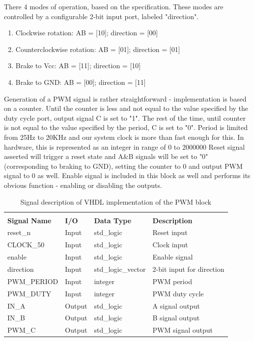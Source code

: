 There 4 modes of operation, based on the specification. These modes are controlled by a configurable 2-bit input port, labeled "direction".
\begin{enumerate}
 \item Clockwise rotation: AB = [10]; direction = [00]
 \item Counterclockwise rotation: AB = [01]; direction = [01]
 \item Brake to Vcc: AB = [11]; direction = [10]
 \item Brake to GND: AB = [00]; direction = [11]
\end{enumerate}

Generation of a PWM signal is rather straightforward - implementation is based on a counter. Until the counter is less and not equal to the value specified by the duty cycle port, output signal C is set to "1". The rest of the time, until counter is not equal to the value specified by the period, C is set to "0". Period is limited from 25Hz to 20KHz and our system clock is more than fast enough for this. In hardware, this is represented as an integer in range of 0 to 2000000 Reset signal asserted will trigger a reset state and A&B signals will be set to "0" (corresponding to braking to GND), setting the counter to 0 and output PWM signal to 0 as well. Enable signal is included in this block as well and performs its obvious function - enabling or disabling the outputs.

\begin{table}[!htbp]
\small
   \caption{Signal description of VHDL implementation of the PWM block}
   \centering
\begin{tabular}{l l l l} \hline\\ 
\textbf{Signal Name} & \textbf{I/O} & \textbf{Data Type} & \textbf{Description}  \\ \hline
reset\_n & Input  & std\_logic & Reset input \\ \hline
CLOCK\_50 & Input  & std\_logic & Clock input \\ \hline
enable & Input & std\_logic & Enable signal \\ \hline
direction & Input & std\_logic\_vector & 2-bit input for direction \\ \hline
PWM\_PERIOD & Input & integer & PWM period \\ \hline
PWM\_DUTY & Input & integer & PWM duty cycle \\ \hline
IN\_A & Output & std\_logic & A signal output \\ \hline
IN\_B & Output & std\_logic & B signal output \\ \hline
PWM\_C & Output & std\_logic & PWM signal output \\ \hline
\end{tabular}
\vspace{-0.5cm}
\end{table}


